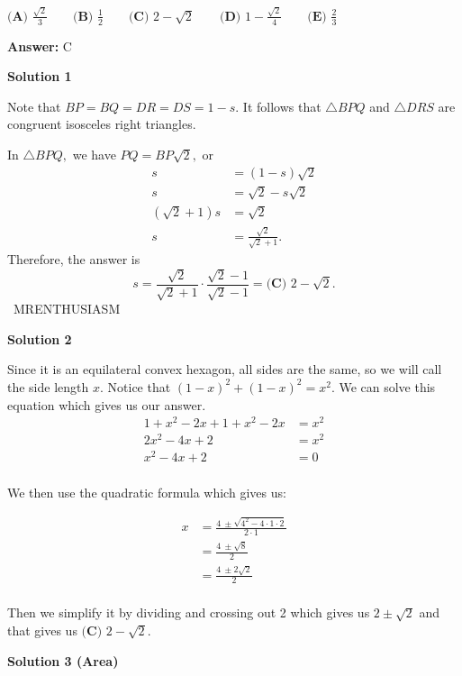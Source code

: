 \begin{enumerate}
 $\textbf{(A) } \frac{\sqrt{2}}{3} \qquad \textbf{(B) } \frac{1}{2} \qquad \textbf{(C) } 2 - \sqrt{2} \qquad \textbf{(D) } 1 - \frac{\sqrt{2}}{4} \qquad \textbf{(E) } \frac{2}{3}$

 \textbf{Answer: }C



\textbf{Solution 1}

Note that $BP=BQ=DR=DS=1-s.$ It follows that $\triangle BPQ$ and $\triangle DRS$ are congruent isosceles right triangles.

 In $\triangle BPQ,$ we have $PQ=BP\sqrt2,$ or 
 \begin{align*} s &= (1-s)\sqrt2 \\ s &= \sqrt2 - s\sqrt2 \\ \left(\sqrt2+1\right)s &= \sqrt2 \\ s &= \frac{\sqrt2}{\sqrt2 + 1}. \end{align*}
Therefore, the answer is 
 \[s = \frac{\sqrt2}{\sqrt2 + 1}\cdot\frac{\sqrt2 - 1}{\sqrt2 - 1} = \boxed{\textbf{(C) } 2 - \sqrt{2}}.\]~MRENTHUSIASM

 



\textbf{Solution 2}

Since it is an equilateral convex hexagon, all sides are the same, so we will call the side length $x$. Notice that $(1-x)^2+(1-x)^2 = x^2$. We can solve this equation which gives us our answer. 
 \begin{align*} 1+x^2-2x+1+x^2-2x &= x^2 \\ 2x^2-4x+2 &= x^2 \\ x^2-4x+2 &= 0 \\ \end{align*}


 We then use the quadratic formula which gives us:

 
 \begin{align*} x &= \frac{4\:\pm\sqrt{4^2-4\cdot 1\cdot 2}}{2\cdot 1} \\ &= \frac{4\:\pm\sqrt{8}}{2} \\ &= \frac{4\:\pm2\sqrt{2}}{2} \\ \end{align*}


 Then we simplify it by dividing and crossing out 2 which gives us $2\pm{\sqrt2}$ and that gives us $\boxed{\textbf{(C) }2-{\sqrt2}}$.

 



\textbf{Solution 3 (Area)}


\end{enumerate}
